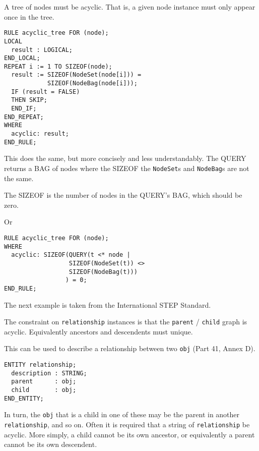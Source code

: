 
    A tree of nodes must be acyclic. That is, a given node instance must only
appear once in the tree.
\begin{verbatim}
RULE acyclic_tree FOR (node);
LOCAL
  result : LOGICAL;
END_LOCAL;
REPEAT i := 1 TO SIZEOF(node);
  result := SIZEOF(NodeSet(node[i])) = 
            SIZEOF(NodeBag(node[i]));
  IF (result = FALSE)
  THEN SKIP;
  END_IF;
END_REPEAT;
WHERE
  acyclic: result;
END_RULE;
\end{verbatim}


\begin{remarks}
\remintro
{}

      This does the same, but more concisely and less understandably.
The QUERY returns a BAG of nodes where the SIZEOF the \texttt{NodeSet}s
and \texttt{NodeBag}s are not the same.

The SIZEOF is the number of nodes in the QUERY's BAG, which should be zero.

\remend
\clearpage
\end{remarks}

\clearpage

Or
\begin{verbatim}
RULE acyclic_tree FOR (node);
WHERE
  acyclic: SIZEOF(QUERY(t <* node | 
                  SIZEOF(NodeSet(t)) <> 
                  SIZEOF(NodeBag(t)))
                 ) = 0;
END_RULE;
\end{verbatim}


\begin{remarks}
\remintro
{}

The next example is taken from the International STEP Standard.

The constraint on \texttt{relationship} instances is that the
\texttt{parent} / \texttt{child} graph is acyclic. Equivalently
ancestors and descendents must unique.

\remend
\end{remarks}


    This can be used to describe a relationship between two \texttt{obj}
(Part 41, Annex D).
\begin{verbatim}
ENTITY relationship;
  description : STRING;
  parent      : obj;
  child       : obj;
END_ENTITY;
\end{verbatim}
In turn, the \texttt{obj} that is a child in one of these may be the
parent in another \texttt{relationship}, and so on.
    Often it is required that a string of \texttt{relationship} be acyclic. 
More simply, a child cannot be its own ancestor, or equivalently a parent
cannot be its own descendent.

